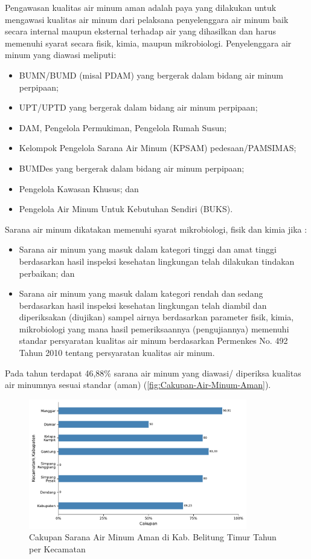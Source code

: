 Pengawasan kualitas air minum aman adalah paya yang dilakukan untuk mengawasi kualitas air minum dari pelaksana penyelenggara air minum baik secara internal maupun eksternal terhadap air yang dihasilkan dan harus memenuhi syarat secara fisik, kimia, maupun mikrobiologi.
Penyelenggara air minum yang diawasi  meliputi:
\begin{itemize}
  \item BUMN/BUMD (misal PDAM) yang bergerak dalam bidang air minum perpipaan;
  \item UPT/UPTD yang bergerak dalam bidang air minum perpipaan;
  \item DAM, Pengelola Permukiman, Pengelola Rumah Susun;
  \item Kelompok Pengelola Sarana Air Minum (KPSAM) pedesaan/PAMSIMAS;
  \item BUMDes yang bergerak dalam bidang air minum perpipaan;
  \item Pengelola Kawasan Khusus; dan
  \item Pengelola Air Minum Untuk Kebutuhan Sendiri (BUKS).
\end{itemize}
Sarana air minum dikatakan memenuhi syarat mikrobiologi, fisik dan kimia jika :
\begin{itemize}
  \item Sarana air minum  yang masuk dalam kategori tinggi dan amat tinggi  berdasarkan hasil inspeksi kesehatan lingkungan telah dilakukan tindakan perbaikan; dan
  \item Sarana air minum yang masuk dalam kategori rendah dan sedang berdasarkan hasil inspeksi   kesehatan lingkungan telah diambil dan diperiksakan (diujikan) sampel airnya berdasarkan parameter fisik, kimia, mikrobiologi yang mana hasil pemeriksaannya (pengujiannya) memenuhi standar persyaratan kualitas air minum berdasarkan Permenkes No. 492 Tahun 2010 tentang  persyaratan kualitas air minum.
\end{itemize}

Pada tahun \tP terdapat 46,88\% sarana air minum yang diawasi/ diperiksa kualitas air minumnya sesuai standar (aman) (\autoref{fig:Cakupan-Air-Minum-Aman}).

\begin{figure}[H]
    \centering
    \includegraphics[width=0.85\textwidth]{bab_07/bab_07_01_airMinumAman}
    \caption{Cakupan Sarana Air Minum Aman di Kab. Belitung Timur Tahun \tP per Kecamatan}
    \label{fig:Cakupan-Air-Minum-Aman}
\end{figure}

